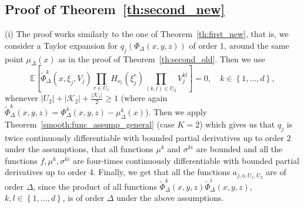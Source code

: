 \documentclass[11pt,a4paper]{amsart}
\theoremstyle{plain}
\theoremstyle{definition}
\theoremstyle{remark}
\numberwithin{equation}{section}
\newcommand*{\EE}{\mathbb E}
\begin{document}
\subsection{Proof of Theorem~\protect\ref{th:second_new}}
(i) The proof works similarly to the one of Theorem~\ref{th:first_new}, that is, we consider a Taylor expansion for $q_j(\Phi_\Delta(x,y,z))$ of order 1, around the same point $\mu_\Delta(x)$ as in the proof of Theorem~\ref{th:second_old}. Then we use 
$$\EE\left[\tilde\Phi_\Delta^k(x,\xi_j,V_j)\prod_{r\in U_1} H_{o_r}(\xi_j^r)
\prod_{(k,l)\in U_2} V_j^{kl}\right]=0,\quad k\in\left\{1,\ldots,d\right\},$$
whenever $\left|U_2\right|+\left|\mathcal{K}_2\right|+\frac{\left|\mathcal{K}_1\right|}{2}\ge 1$ (where again $\tilde\Phi_\Delta^k(x,y,z)=\Phi_\Delta^k(x,y,z)-\mu_\Delta^k(x)$). Then
we apply Theorem~\ref{smooth:func_assump_general} (case $K=2$) which gives us that $q_j$ is twice continuously differentiable with bounded partial derivatives up to order 2 under the assumptions, that all functions $\mu^k$ and $\sigma^{ki}$ are bounded and all the functions $f,\mu^k,\sigma^{ki}$ are four-times continuously differentiable with bounded partial derivatives up to order 4. Finally, we get that all the functions $a_{j,o,U_1,U_2}$ are of order $\Delta$, since the product of all functions $\tilde\Phi_\Delta^k(x,y,z)\tilde\Phi_\Delta^l(x,y,z)$, $k,l\in\left\{1,\ldots,d\right\}$, is of order $\Delta$ under the above assumptions.
\end{document}
